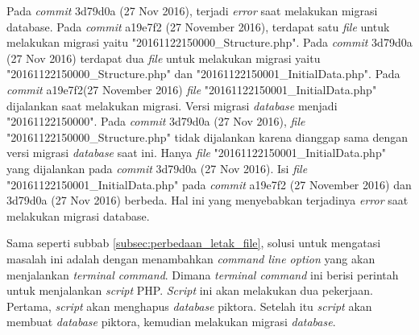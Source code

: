 Pada \textit{commit} 3d79d0a (27 Nov 2016), terjadi \textit{error} saat melakukan migrasi database. Pada \textit{commit} a19e7f2 (27 November 2016), terdapat satu \textit{file} untuk melakukan migrasi yaitu "20161122150000\_Structure.php". Pada \textit{commit} 3d79d0a (27 Nov 2016) terdapat dua \textit{file} untuk melakukan migrasi yaitu "20161122150000\_Structure.php" dan "20161122150001\_InitialData.php". Pada \textit{commit} a19e7f2(27 November 2016) \textit{file} "20161122150001\_InitialData.php" dijalankan saat melakukan migrasi. Versi migrasi \textit{database} menjadi "20161122150000". Pada \textit{commit} 3d79d0a (27 Nov 2016), \textit{file} "20161122150000\_Structure.php" tidak dijalankan karena dianggap sama dengan versi migrasi \textit{database} saat ini. Hanya \textit{file} "20161122150001\_InitialData.php" yang dijalankan pada \textit{commit} 3d79d0a (27 Nov 2016). Isi \textit{file} "20161122150001\_InitialData.php" pada \textit{commit} a19e7f2 (27 November 2016) dan 3d79d0a (27 Nov 2016) berbeda. Hal ini yang menyebabkan terjadinya \textit{error} saat melakukan migrasi database.  

Sama seperti subbab \ref{subsec:perbedaan_letak_file}, solusi untuk mengatasi masalah ini adalah dengan menambahkan \textit{command line option} yang akan menjalankan \textit{terminal command}. Dimana \textit{terminal command} ini berisi perintah untuk menjalankan \textit{script} PHP. \textit{Script} ini akan melakukan dua pekerjaan. Pertama, \textit{script} akan menghapus \textit{database} piktora. Setelah itu \textit{script} akan membuat \textit{database} piktora, kemudian melakukan migrasi \textit{database}. 
 
